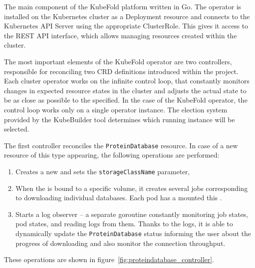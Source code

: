 The main component of the KubeFold platform written in Go.
The operator is installed on the Kubernetes cluster as a Deployment resource and connects to the Kubernetes API Server using the appropriate ClusterRole.
This gives it access to the REST API interface, which allows managing resources created within the cluster.

The most important elements of the KubeFold operator are two controllers, responsible for reconciling two CRD definitions introduced within the project.
Each cluster operator works on the infinite control loop, that constantly monitors changes in expected resource states in the cluster and adjusts the actual state to be as close as possible to the specified.
In the case of the KubeFold operator, the control loop works only on a single operator instance.
The election system provided by the KubeBuilder tool determines which running instance will be selected.

The first controller reconciles the \texttt{ProteinDatabase} resource.
In case of a new resource of this type appearing, the following operations are performed:
\begin{enumerate}
    \item Creates a new  and sets the \texttt{storageClassName} parameter,
    \item When the  is bound to a specific volume, it creates several jobs corresponding to downloading individual databases.
    Each pod has a mounted this .
    \item Starts a log observer -- a separate goroutine constantly monitoring job states, pod states, and reading logs from them.
    Thanks to the logs, it is able to dynamically update the \texttt{ProteinDatabase} status informing the user about the progress of downloading and also monitor the connection throughput.
\end{enumerate}
These operations are shown in figure~\ref{fig:proteindatabase_controller}.

